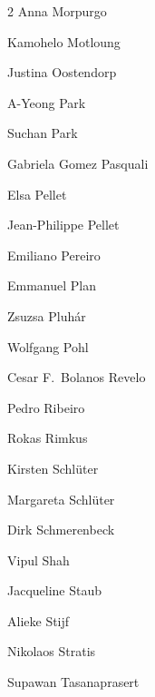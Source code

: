 \begin{multicols}{2}
   \ifdefined\AuthorMorpurgoAnna {} Anna Morpurgo\fi

   \ifdefined\AuthorMotloungKamohelo {} Kamohelo Motloung\fi

   \ifdefined\AuthorOostendorpJustina {} Justina Oostendorp\fi

   \ifdefined\AuthorParkAYeong {} A-Yeong Park\fi

   \ifdefined\AuthorParkSuchan {} Suchan Park\fi

   \ifdefined\AuthorPasqualiGomezGabriela {} Gabriela Gomez Pasquali\fi

   \ifdefined\AuthorPelletElsa {} Elsa Pellet\fi

   \ifdefined\AuthorPelletJeanPhilippe {} Jean-Philippe Pellet\fi

   \ifdefined\AuthorPereiroEmiliano {} Emiliano Pereiro\fi

   \ifdefined\AuthorPlanEmmanuel {} Emmanuel Plan\fi

   \ifdefined\AuthorPluharZsuzsa {} Zsuzsa Pluhár\fi

   \ifdefined\AuthorPohlWolfgang {} Wolfgang Pohl\fi

   \ifdefined\AuthorReveloBolanosFCesar {} Cesar F.~Bolanos Revelo\fi

   \ifdefined\AuthorRibeiroPedro {} Pedro Ribeiro\fi

   \ifdefined\AuthorRimkusRokas {} Rokas Rimkus\fi

   \ifdefined\AuthorSchluterKirsten {} Kirsten Schlüter\fi

   \ifdefined\AuthorSchluterMargareta {} Margareta Schlüter\fi

   \ifdefined\AuthorSchmerenbeckDirk {} Dirk Schmerenbeck\fi

   \ifdefined\AuthorShahVipul {} Vipul Shah\fi

   \ifdefined\AuthorStaubJacqueline {} Jacqueline Staub\fi

   \ifdefined\AuthorStijfAlieke {} Alieke Stijf\fi

   \ifdefined\AuthorStratisNikolaos {} Nikolaos Stratis\fi

   \ifdefined\AuthorTasanaprasertSupawan {} Supawan Tasanaprasert\fi


\end{multicols}
